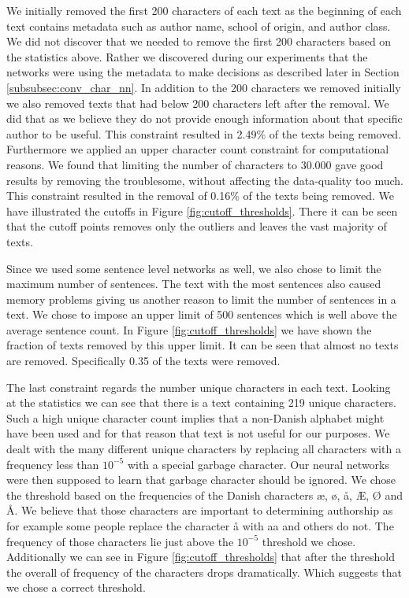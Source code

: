 We initially removed the first 200 characters of each text as the beginning of
each text contains metadata such as author name, school of origin, and author
class. We did not discover that we needed to remove the first 200 characters
based on the statistics above. Rather we discovered during our experiments
that the networks were using the metadata to make decisions as described later
in Section \ref{subsubsec:conv_char_nn}. In addition to the 200 characters we
removed initially we also removed texts that had below 200 characters left after
the removal. We did that as we believe they do not provide enough information
about that specific author to be useful. This constraint resulted in 2.49\%
of the texts being removed. Furthermore we applied an upper character count
constraint for computational reasons. We found that limiting the number of
characters to 30.000 gave good results by removing the troublesome, without
affecting the data-quality too much. This constraint resulted in the removal of
0.16\% of the texts being removed. We have illustrated the cutoffs in Figure
\ref{fig:cutoff_thresholds}. There it can be seen that the cutoff points removes
only the outliers and leaves the vast majority of texts.

Since we used some sentence level networks as well, we also chose to limit
the maximum number of sentences. The text with the most sentences also caused
memory problems giving us another reason to limit the number of sentences in a
text. We chose to impose an upper limit of 500 sentences which is well above the
average sentence count. In Figure \ref{fig:cutoff_thresholds} we have shown the
fraction of texts removed by this upper limit. It can be seen that almost no
texts are removed. Specifically 0.35 \textperthousand of the texts were removed.

The last constraint regards the number unique characters in each text. Looking
at the statistics we can see that there is a text containing 219 unique
characters. Such a high unique character count implies that a non-Danish
alphabet might have been used and for that reason that text is not useful for
our purposes. We dealt with the many different unique characters by replacing
all characters with a frequency less than $10^{-5}$ with a special garbage
character. Our neural networks were then supposed to learn that garbage
character should be ignored. We chose the threshold based on the frequencies
of the Danish characters æ, ø, å, Æ, Ø and Å. We believe that those
characters are important to determining authorship as for example some people
replace the character å with aa and others do not. The frequency of those
characters lie just above the $10^{-5}$ threshold we chose. Additionally we can
see in Figure \ref{fig:cutoff_thresholds} that after the threshold the overall
of frequency of the characters drops dramatically. Which suggests that we chose
a correct threshold.

